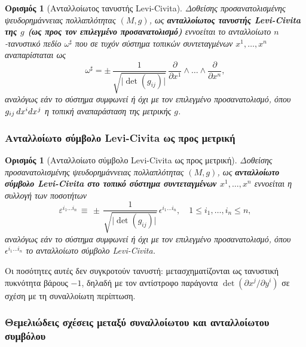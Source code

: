 \documentclass[11pt,a4paper,twoside,openright]{book}
\newtheorem{definition}[lemma]{Ορισμός}
\begin{document}
\begin{definition}[Ανταλλοίωτος τανυστής Levi-Civita]
	\label{def:contravariant-levi-civita}
Δοθείσης προσανατολισμένης ψευδορημάννειας πολλαπλότητας $(M, g)$,
ως \textbf{ανταλλοίωτος τανυστής Levi-Civita της $g$ (ως προς τον επιλεγμένο προσανατολισμό)} εννοείται το ανταλλοίωτο $n$-τανυστικό πεδίο $\omega^\sharp$
που σε τυχόν σύστημα τοπικών συντεταγμένων
$x^1, \dots, x^n$ αναπαρίσταται ως
\begin{equation}\label{eq:contravariant-levi-civita}
\omega^\sharp
=
\pm
\,
\frac{1}{\sqrt{\lvert \det(g_{ij}) \rvert}}
\,
\frac{\partial}{\partial x^1} \wedge \dots \wedge \frac{\partial}{\partial x^n},
\end{equation}
αναλόγως εάν το σύστημα συμφωνεί ή όχι με τον επιλεγμένο προσανατολισμό,
όπου $g_{ij}\,dx^i dx^{\hspace{.5pt}j}$ η τοπική αναπαράσταση της μετρικής $g$.
\end{definition}

\subsubsection{Ανταλλοίωτο σύμβολο Levi-Civita ως προς μετρική}
	\label{sec:contravariant-levi-civita-symbol}

\begin{definition}[Ανταλλοίωτο σύμβολο Levi-Civita ως προς μετρική]
	\label{def:contravariant-levi-civita-symbol}
Δοθείσης προσανατολισμένης ψευδορημάννειας πολλαπλότητας $(M, g)$,
ως \textbf{ανταλλοίωτο σύμβολο Levi-Civita στο τοπικό σύστημα συντεταγμένων
$x^1, \dots, x^n$} εννοείται η συλλογή των ποσοτήτων
\begin{equation}\label{eq:contravariant-levi-civita-symbol}
\varepsilon^{i_1 \dots i_n}
\,
\equiv
\,
\pm
\,
\frac{1}{\sqrt{\lvert \det(g_{ij}) \rvert}}
\,
\epsilon^{i_1 \dots i_n},
\quad
1 \le i_1, \dots, i_n \le n,
\end{equation}
αναλόγως εάν το σύστημα συμφωνεί ή όχι με τον επιλεγμένο προσανατολισμό,
όπου $\epsilon^{i_1 \dots i_n}$ το ανταλλοίωτο σύμβολο Levi-Civita.
\end{definition}

\noindent
Οι ποσότητες αυτές δεν συγκροτούν τανυστή: μετασχηματίζονται ως τανυστική πυκνότητα βάρους $-1$, δηλαδή με τον αντίστροφο παράγοντα $\det(\partial x^j / \partial y^i)$ σε σχέση με τη συναλλοίωτη περίπτωση.

\subsubsection{Θεμελιώδεις σχέσεις μεταξύ συναλλοίωτου και ανταλλοίωτου συμβόλου}
	\label{sec:fundamental-relations-levi-civita}
\end{document}

